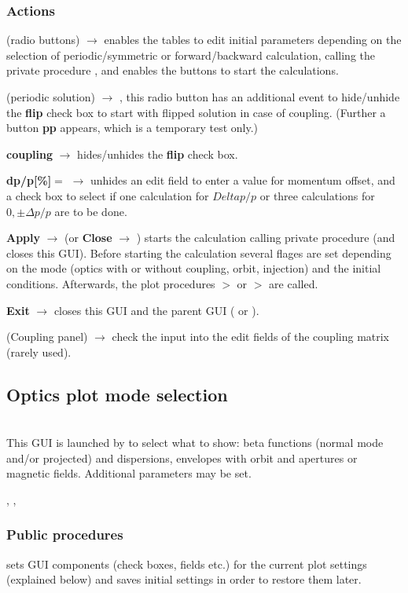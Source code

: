 \documentclass[12pt]{article}
\newcommand\code[1]{{\tt #1}}
\newcommand{\ofld}[1]{\colorbox{black!15}{{{\color{black}\bf #1}}}}
\newcommand{\ofldx}[1]{\colorbox{black!15}{{\color{black}(#1)}}}
\newcommand\guico[1]{{\color{blue}\code{#1}}}
\newcommand{\unico}[1]{{\color{burntorange}\code{#1}}}
\newcommand{\evcod}[2]{\ofld{#1} $\rightarrow$ \guico{#2}}
\newcommand{\evcodx}[2]{\ofldx{#1} $\rightarrow$ \guico{#2}}
\newcommand{\prcod}[2]{\opauni{#1}$>$\unico{#2}}
\newcommand{\opagui}[1]{\colorbox{blue!20}{{\color{black}\code{#1}}}}
\newcommand{\oguih}[2]{\subsection{\label{#2}#1}{\Huge\opagui{#2}}\\}
\newcommand{\ogui}[1]{\hyperref[#1]{\opagui{#1}}}
\newcommand{\opauni}[1]{\colorbox{orange!30}{{\color{black}\code{#1}}}}
\newcommand{\ouni}[1]{\hyperref[#1]{\opauni{#1}}}
\newcommand{\uses}[1]{\flushleft {\bf Uses:} #1}
\newcommand{\desc}[1]{#1}
\newcommand{\act}[1]{\subsubsection*{Actions} #1}
\newcommand{\ppro}[1]{\subsubsection*{Public procedures} #1}
\begin{document}
\act{
\evcodx{radio buttons}{rbutClick} enables the tables to edit initial parameters depending on the selection of periodic/symmetric or forward/backward calculation, calling the private procedure \guico{set\_pan\_ini}, and enables the buttons to start the calculations.

\evcodx{periodic solution}{rbutperChange}, this radio button has an additional event to hide/unhide the \ofld{flip} check box to start with flipped solution in case of coupling. (Further a button \ofld{pp} appears, which is a temporary test only.)

\evcod{coupling}{chk\_coupChange} hides/unhides the \ofld{flip} check box. 

\evcod{dp/p[\%]$=$}{but\_dppClick} unhides an edit field to enter a value for momentum offset, and a check box to select if one calculation for $Delta p/p$  or three calculations for $0,\pm\Delta p/p$ are to be done.

\evcod{Apply}{butapplyClick} (or \evcod{Close}{butcloClick}) starts the calculation calling private procedure \guico{Go} (and closes this GUI). Before starting the calculation several flages are set depending on the mode (optics with or without coupling, orbit, injection) and the initial conditions. Afterwards, the plot procedures \prcod{linoplib}{OpticCalc} or \prcod{linoplib}{OrbitCalc} are called.

\evcod{Exit}{butexitClick} closes this GUI and the parent GUI (\ogui{opalinop} or \ogui{opaorbit}).

\evcodx{Coupling panel}{ed\_couKeyPress,ed\_couExit} check the input into the edit fields of the coupling matrix (rarely used).
}


\oguih{Optics plot mode selection}{obetenvmag} 

\desc{This GUI is launched by \ogui{opalinop} to select what to show: beta functions (normal mode and/or projected) and dispersions, envelopes with orbit and apertures or magnetic fields. Additional parameters may be set.
}

\uses{\ouni{globlib}, \ouni{mathlib}, \ouni{comauxlib}} 

\ppro{
\guico{Load} sets GUI components (check boxes, fields etc.) for the current plot settings (explained below) and saves initial settings in order to restore them later.
}
\end{document}
